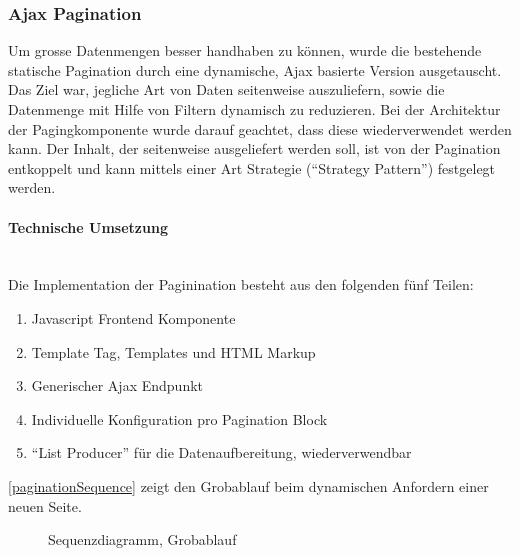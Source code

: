 \subsubsection{Ajax Pagination} 
Um grosse Datenmengen besser handhaben zu können, wurde die bestehende statische
Pagination durch eine dynamische, Ajax basierte Version ausgetauscht. Das Ziel
war, jegliche Art von Daten seitenweise auszuliefern, sowie die Datenmenge mit
Hilfe von Filtern dynamisch zu reduzieren. Bei der Architektur der
Pagingkomponente wurde darauf geachtet, dass diese wiederverwendet werden kann.
Der Inhalt, der seitenweise ausgeliefert werden soll, ist von der Pagination
entkoppelt und kann mittels einer Art Strategie (\enquote{Strategy Pattern}\cite{gamma1994design}) festgelegt werden.

\paragraph{Technische Umsetzung} \hspace{0pt} \\
Die Implementation der Paginination besteht aus den folgenden fünf Teilen:
\begin{enumerate}
	\item Javascript Frontend Komponente
	\item Template Tag, Templates und HTML Markup
	\item Generischer Ajax Endpunkt
	\item Individuelle Konfiguration pro Pagination Block
	\item \enquote{List Producer} für die Datenaufbereitung, wiederverwendbar
\end{enumerate}

\autoref{paginationSequence} zeigt den Grobablauf beim dynamischen Anfordern einer
neuen Seite.

\begin{figure}[H]	
	\centering
	
	\caption{Sequenzdiagramm, Grobablauf}
	\label{paginationSequence}
\end{figure}


